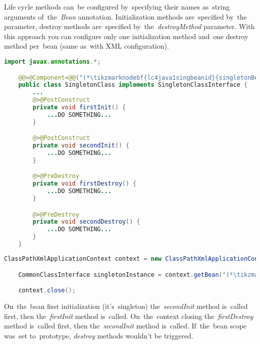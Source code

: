 Life cycle methods can~be configured by~specifying their names as~string arguments of~the~\textit{Bean} annotation.
Initialization methods are~specified by~the~ parameter, destroy methods are~specified by~the~\textit{destroyMethod} parameter.
With this approach you can configure only one initialization method and~one destroy method per~bean (same as~with XML configuration).
\newpage

\begin{lstlisting}[language=Java, title={Singleton bean class with multiple life cycle methods}]
    import javax.annotations.*;

    @@>@Component<@@("(*\tikzmarknodebf{lc4java1singbeanid}{singletonBeanId}[ForestGreen]*)")
    public class SingletonClass implements SingletonClassInterface {
        ...
        @>@PostConstruct
        private void firstInit() {
            ...DO SOMETHING...
        }

        @>@PostConstruct
        private void secondInit() {
            ...DO SOMETHING...
        }

        @>@PreDestroy
        private void firstDestroy() {
            ...DO SOMETHING...
        }

        @>@PreDestroy
        private void secondDestroy() {
            ...DO SOMETHING...
        }
    }
\end{lstlisting}
\begin{lstlisting}[language=Java, title={Usage}]
    ClassPathXmlApplicationContext context = new ClassPathXmlApplicationContext("configurationFile.xml");

    CommonClassInterface singletonInstance = context.getBean("(*\tikzmarknodebf{lc4java2singbeanid}{singletonBeanId}[ForestGreen]*)", SingletonClassInterface.class);

    context.close();
\end{lstlisting}

\noindent On~the~bean first initialization (it's~singleton) the~\textit{secondInit} method is~called first, then the~\textit{firstInit} method is~called.
On~the~context closing the~\textit{firstDestroy} method is~called first, then the~\textit{secondInit} method is~called.
If~the~bean scope was~set to~prototype, \textit{destroy} methods wouldn't be triggered.
\newpage

